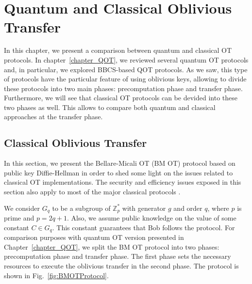 


%

\chapter{Quantum and Classical Oblivious Transfer}

In this chapter, we present a comparison between quantum and classical OT protocols. In chapter~\ref{chapter_QOT}, we reviewed several quantum OT protocols and, in particular, we explored BBCS-based QOT protocols. As we saw, this type of protocols have the particular feature of using oblivious keys, allowing to  divide these protocols into two main phases: precomputation phase and transfer phase. Furthermore, we will see that classical OT protocols can be devided into these two phases as well. This allows to compare both quantum and classical approaches at the transfer phase.


\section{Classical Oblivious Transfer}


In this section, we present the Bellare-Micali OT (BM OT) protocol \cite{BM89} based on public key Diffie-Hellman in order to shed some light on the issues related to classical OT implementations. The security and efficiency issues exposed in this section also apply to most of the major classical protocols \cite{EGL85, NP01, CO15}.

We consider $G_q$ to be a subgroup of $\mathbb{Z}^*_p$ with generator $g$ and order $q$, where $p$ is prime and $p = 2q + 1$. Also, we assume public knowledge on the value of some constant $C\in G_q$. This constant guarantees that Bob follows the protocol. For comparison purposes with quantum OT version presented in Chapter~\ref{chapter_QOT}, we split the BM OT protocol into two phases: precomputation phase and transfer phase. The first phase sets the necessary resources to execute the oblivious transfer in the second phase. The protocol is shown in Fig.~\ref{fig:BMOTProtocol}.


